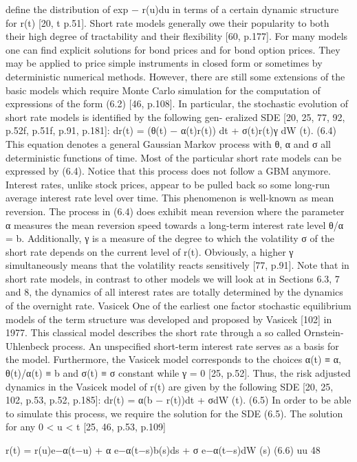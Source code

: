 define the distribution of exp − r(u)du in terms of a certain dynamic structure for r(t) [20,
t
p.51].
Short rate models generally owe their popularity to both their high degree of tractability and
their flexibility [60, p.177]. For many models one can find explicit solutions for bond prices and for bond option prices. They may be applied to price simple instruments in closed form or sometimes by deterministic numerical methods. However, there are still some extensions of the basic models which require Monte Carlo simulation for the computation of expressions of the form (6.2) [46, p.108].
In particular, the stochastic evolution of short rate models is identified by the following gen- eralized SDE [20, 25, 77, 92, p.52f, p.51f, p.91, p.181]:
dr(t) = (θ(t) − α(t)r(t)) dt + σ(t)r(t)γ dW (t). (6.4)
This equation denotes a general Gaussian Markov process with θ, α and σ all deterministic functions of time. Most of the particular short rate models can be expressed by (6.4). Notice that this process does not follow a GBM anymore. Interest rates, unlike stock prices, appear to be pulled back so some long-run average interest rate level over time. This phenomenon is well-known as mean reversion. The process in (6.4) does exhibit mean reversion where the parameter α measures the mean reversion speed towards a long-term interest rate level θ/α = b. Additionally, γ is a measure of the degree to which the volatility σ of the short rate depends on the current level of r(t). Obviously, a higher γ simultaneously means that the volatility reacts sensitively [77, p.91]. Note that in short rate models, in contrast to other models we will look at in Sections 6.3, 7 and 8, the dynamics of all interest rates are totally determined by the dynamics of the overnight rate.
Vasicek
One of the earliest one factor stochastic equilibrium models of the term structure was developed and proposed by Vasicek [102] in 1977. This classical model describes the short rate through a so called Ornstein-Uhlenbeck process. An unspecified short-term interest rate serves as a basis for the model. Furthermore, the Vasicek model corresponds to the choices α(t) ≡ α, θ(t)/α(t) ≡ b and σ(t) ≡ σ constant while γ = 0 [25, p.52]. Thus, the risk adjusted dynamics in the Vasicek model of r(t) are given by the following SDE [20, 25, 102, p.53, p.52, p.185]:
dr(t) = α(b − r(t))dt + σdW (t). (6.5) In order to be able to simulate this process, we require the solution for the SDE (6.5). The
solution for any 0 < u < t [25, 46, p.53, p.109]

r(t) = r(u)e−α(t−u) + α e−α(t−s)b(s)ds + σ e−α(t−s)dW (s) (6.6) uu
48

